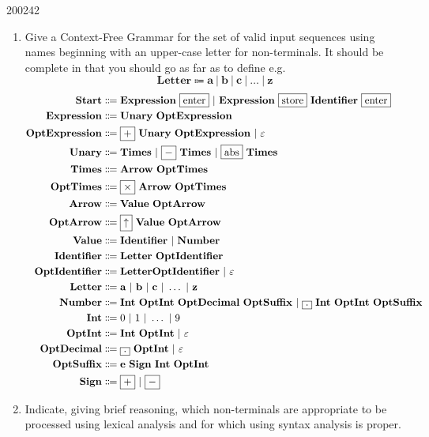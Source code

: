 \documentclass[10pt,\jkfside,a4paper]{article}
\begin{document}
\begin{examquestion}{2002}{4}{2}
\begin{enumerate}
\item Give a Context-Free Grammar for the set of valid input sequences using
names beginning with an upper-case letter for non-terminals. It should be
complete in that you should go as far as to define e.g.
\[
\mathbf{Letter} \Coloneqq \mathbf{a} \ | \ \mathbf{b} \ | \ \mathbf{c} \ |
\ \dots \ | \ \mathbf{z}
\]
\begin{align*}
\Start &\Coloneqq \Expression \ \framebox{enter} \ | \ \Expression \
\framebox{store} \ \Identifier \ \framebox{enter} \\
\Expression &\Coloneqq \Unary \ \OptExpression \\
\OptExpression &\Coloneqq \framebox{$+$} \ \Unary \ \OptExpression \ | \
\varepsilon \\
\Unary &\Coloneqq \Times \ | \ \framebox{$-$} \ \Times \ | \ \framebox{abs} \
\Times \\
\Times &\Coloneqq \Arrow \ \OptTimes \\
\OptTimes &\Coloneqq \framebox{$\times$} \ \Arrow \ \OptTimes \\
\Arrow &\Coloneqq \Value \ \OptArrow \\
\OptArrow &\Coloneqq \framebox{$\uparrow$} \ \Value \ \OptArrow \\
\Value &\Coloneqq \Identifier \ | \ \Number \\
\Identifier &\Coloneqq \Letter \ \OptIdentifier \\
\OptIdentifier &\Coloneqq \Letter \OptIdentifier \ | \ \varepsilon \\
\Letter &\Coloneqq \mathbf{a} \ | \ \mathbf{b} \ | \ \mathbf{c} \ | \ \dots \
 | \ \mathbf{z} \\
\Number &\Coloneqq \Int \ \OptInt \ \OptDecimal \ \OptSuffix \ | \
\framebox{$.$} \ \Int \ \OptInt \ \OptSuffix \\
\Int &\Coloneqq 0 \ | \ 1 \ | \ \dots \ | \ 9 \\
\OptInt &\Coloneqq \Int \ \OptInt \ | \ \varepsilon \\
\OptDecimal &\Coloneqq \framebox{$.$} \ \OptInt \ | \ \varepsilon \\
\OptSuffix &\Coloneqq \mathbf{e} \ \Sign \ \Int \ \OptInt \\
\Sign &\Coloneqq \framebox{$+$} \ | \ \framebox{$-$} \\
\end{align*}

\item Indicate, giving brief reasoning, which non-terminals are appropriate
to be processed using lexical analysis and for which using syntax analysis
is proper.


\end{enumerate}
\end{examquestion}
\end{document}
